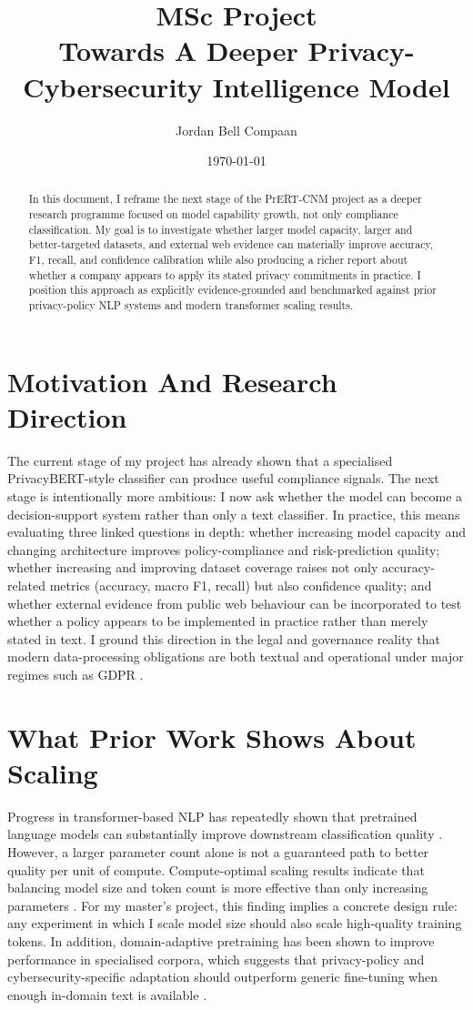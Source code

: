 \documentclass[12pt]{article}
\title{MSc Project\\
Towards A Deeper Privacy-Cybersecurity Intelligence Model}
\author{Jordan Bell Compaan}
\date{\today}
\begin{document}
\maketitle

\begin{abstract}
In this document, I reframe the next stage of the PrERT-CNM project as a deeper research programme focused on model capability growth, not only compliance classification. My goal is to investigate whether larger model capacity, larger and better-targeted datasets, and external web evidence can materially improve accuracy, F1, recall, and confidence calibration while also producing a richer report about whether a company appears to apply its stated privacy commitments in practice. I position this approach as explicitly evidence-grounded and benchmarked against prior privacy-policy NLP systems and modern transformer scaling results.
\end{abstract}

\section{Motivation And Research Direction}
The current stage of my project has already shown that a specialised PrivacyBERT-style classifier can produce useful compliance signals. The next stage is intentionally more ambitious: I now ask whether the model can become a decision-support system rather than only a text classifier. In practice, this means evaluating three linked questions in depth: whether increasing model capacity and changing architecture improves policy-compliance and risk-prediction quality; whether increasing and improving dataset coverage raises not only accuracy-related metrics (accuracy, macro F1, recall) but also confidence quality; and whether external evidence from public web behaviour can be incorporated to test whether a policy appears to be implemented in practice rather than merely stated in text. I ground this direction in the legal and governance reality that modern data-processing obligations are both textual and operational under major regimes such as GDPR \citep{gdpr2016}.

\section{What Prior Work Shows About Scaling}
Progress in transformer-based NLP has repeatedly shown that pretrained language models can substantially improve downstream classification quality \citep{devlin2019bert,liu2019roberta}. However, a larger parameter count alone is not a guaranteed path to better quality per unit of compute. Compute-optimal scaling results indicate that balancing model size and token count is more effective than only increasing parameters \citep{hoffmann2022chinchilla}. For my master's project, this finding implies a concrete design rule: any experiment in which I scale model size should also scale high-quality training tokens. In addition, domain-adaptive pretraining has been shown to improve performance in specialised corpora, which suggests that privacy-policy and cybersecurity-specific adaptation should outperform generic fine-tuning when enough in-domain text is available \citep{gururangan2020dontstop}.
\end{document}
